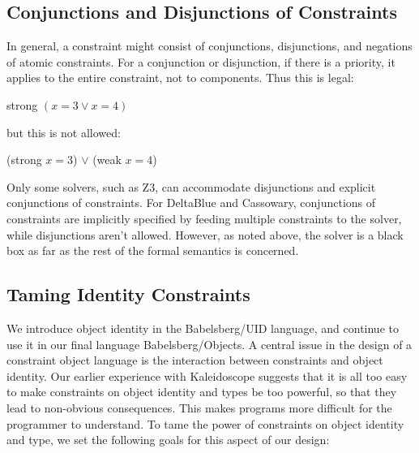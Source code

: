 \documentclass{article}
\begin{document}
\subsection{Conjunctions and Disjunctions of Constraints}

In general, a constraint might consist of conjunctions, disjunctions,
and negations of atomic constraints.  For a conjunction or
disjunction, if there is a priority, it applies to the entire
constraint, not to components.  Thus this is legal:

strong $(x=3 \vee x=4)$

but this is not allowed:

(strong $x=3$) $\vee$ (weak $x=4$)

Only some solvers, such as Z3, can accommodate disjunctions and
explicit conjunctions of constraints.  For DeltaBlue and Cassowary,
conjunctions of constraints are implicitly specified by feeding
multiple constraints to the solver, while disjunctions aren't allowed.
However, as noted above, the solver is a black box as far as the rest
of the formal semantics is concerned.

\subsection{Taming Identity Constraints}
\label{sec:taming-identity-constraints}

We introduce object identity in the Babelsberg/UID language, and
continue to use it in our final language Babelsberg/Objects.  A
central issue in the design of a constraint object language is the
interaction between constraints and object identity.  Our earlier
experience with Kaleidoscope suggests that it is all too easy to make
constraints on object identity and types be too powerful, so that they
lead to non-obvious consequences.  This makes programs more difficult
for the programmer to understand.  To tame the power of constraints on
object identity and type, we set the following goals for this aspect
of our design:
\end{document}
